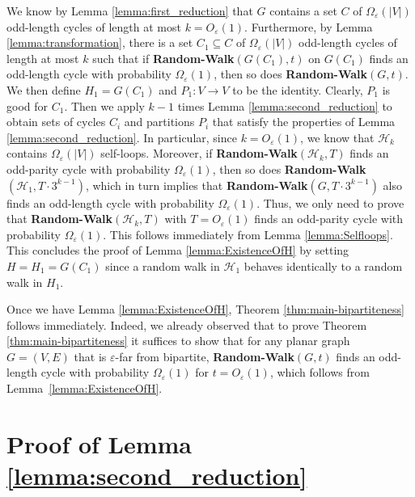 \documentclass[11pt]{article}
\newcommand{\eps}{\ensuremath{\epsilon}}
\def\epsilon{\ensuremath{\varepsilon}}
\newcommand{\RW}{{\bf Random-Walk}}
\begin{document}
We know by Lemma \ref{lemma:first_reduction} that $G$ contains a set $C$ of $\Omega_{\eps}(|V|)$ odd-length cycles of length at most $k = O_{\eps}(1)$. Furthermore, by Lemma \ref{lemma:transformation}, there is a set $C_1 \subseteq C$ of $\Omega_{\eps}(|V|)$ odd-length cycles of length at most $k$ such that if \RW$(G(C_1),t)$ on $G(C_1)$ finds an odd-length cycle with probability $\Omega_{\eps}(1)$, then so does \RW$(G,t)$.
We then define $H_1 = G(C_1)$ and $P_1:V \rightarrow V$ to be the identity. Clearly, $P_1$ is good for $C_1$. Then we apply $k-1$ times Lemma \ref{lemma:second_reduction} to obtain sets of cycles $C_i$ and partitions $P_i$ that satisfy the properties of Lemma \ref{lemma:second_reduction}. In particular, since $k = O_\eps(1)$, we know that $\mathcal H_k$ contains $\Omega_{\eps}(|V|)$ self-loops. Moreover, if \RW$(\mathcal H_k, T)$ finds an odd-parity cycle with probability $\Omega_{\eps}(1)$, then so does \RW$(\mathcal H_1, T \cdot 3^{k-1})$, which in turn implies that \RW$(G, T \cdot 3^{k-1})$ also finds an odd-length cycle with probability $\Omega_{\eps}(1)$. Thus, we only need to prove that \RW$(\mathcal H_k, T)$ with $T = O_{\eps}(1)$ finds an odd-parity cycle with probability $\Omega_{\eps}(1)$. This follows immediately from Lemma \ref{lemma:Selfloops}. This concludes the proof of Lemma \ref{lemma:ExistenceOfH} by setting $H = H_1 = G(C_1)$ since 
a random walk in $\mathcal H_1$ behaves identically to a random walk in $H_1$.

Once we have Lemma \ref{lemma:ExistenceOfH}, Theorem \ref{thm:main-bipartiteness} follows immediately. Indeed, we already observed that to prove Theorem \ref{thm:main-bipartiteness} it suffices to show that for any planar graph $G = (V,E)$ that is $\eps$-far from bipartite, \RW$(G,t)$ finds an odd-length cycle with probability $\Omega_{\eps}(1)$ for $t = O_{\eps}(1)$, which follows from Lemma~\ref{lemma:ExistenceOfH}.



\section{Proof of Lemma \ref{lemma:second_reduction}}
\label{sec:proof-of-lemma:second_reduction}
\end{document}
